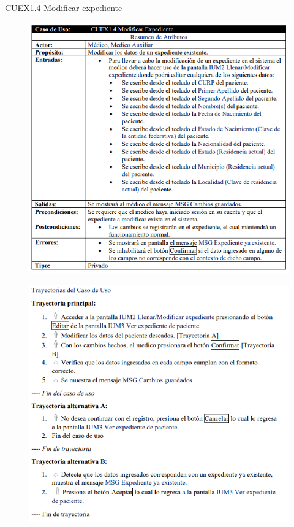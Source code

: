 \documentclass[12pt,letterpaper]{article}
\begin{document}
            \newpage
            CUEX1.4 Modificar expediente 
            \begin{figure}[H]
                \centering
                \includegraphics [scale=0.8]{specs/specModificarExpediente}
            \end{figure}
            \begin{figure}[H]
                \centering
                \includegraphics [scale=0.9]{specs/trayModificarExpediente}
            \end{figure}
\end{document}
